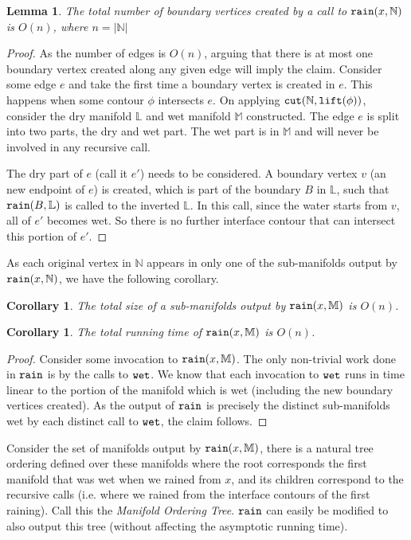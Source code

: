 \documentclass[11pt]{article}
\newtheorem{lemma}[theorem]{Lemma}
\newtheorem{corollary}[theorem]{Corollary}
\theoremstyle{definition}
\newcommand{\LL}{\mathbb{L}}
\newcommand{\MM}{\mathbb{M}}
\newcommand{\NN}{\mathbb{N}}
\newcommand{\cut}{{\tt cut}}
\newcommand{\lift}{{\tt lift}}
\newcommand{\rain}{{\tt rain}}
\newcommand{\wet}{{\tt wet}}
\begin{document}
\begin{lemma}\label{lem:new-verts}
The total number of boundary vertices created by a call to $\rain(x, \NN)$ is $O(n)$, where $n=|\NN|$
\end{lemma}
\begin{proof}
As the number of edges is $O(n)$, arguing that there is at most one boundary vertex created along any given edge will imply the claim.
Consider some edge $e$ and take the first time a boundary vertex is created in $e$.
This happens when some contour $\phi$ intersects $e$. On applying $\cut(\NN,\lift(\phi))$,
consider the dry manifold $\LL$ and wet manifold $\MM$ constructed. The edge $e$ is split into two parts, the dry and wet part.
The wet part is in $\MM$ and will never be involved in any recursive call.

The dry part of $e$ (call it $e'$) needs to be considered.
A boundary vertex $v$ (an new endpoint of $e$) is created, which is part of the boundary $B$ in $\LL$,
such that $\rain(B,\LL)$ is called to the inverted $\LL$. In this call, since the water starts from $v$,
all of $e'$ becomes wet. So there is no further interface contour that can intersect this portion of $e'$.
\end{proof}

As each original vertex in $\NN$ appears in only one of the sub-manifolds output by $\rain(x,\NN)$, we have the following corollary.

\begin{corollary}
The total size of a sub-manifolds output by $\rain(x,\MM)$ is $O(n)$.
\end{corollary}

\begin{corollary} \label{cor:rain-time} The total running time of $\rain(x,\MM)$ is $O(n)$.
\end{corollary}

\begin{proof} Consider some invocation to $\rain(x,\MM)$. The only non-trivial work done in $\rain$ is by the calls to $\wet$.
We know that each invocation to $\wet$ runs in time linear 
to the portion of the manifold which is wet (including the new boundary vertices created).  
As the output of $\rain$ is precisely the distinct sub-manifolds wet by each distinct call to $\wet$, the claim follows.
\end{proof}

Consider the set of manifolds output by $\rain(x,\MM)$, there is a natural tree ordering defined over these manifolds where the 
root corresponds the first manifold that was wet when we rained from $x$, and its children correspond to the recursive calls 
(i.e. where we rained from the interface contours of the first raining).  Call this the \emph{Manifold Ordering Tree}.
$\rain$ can easily be modified to also output this tree (without affecting the asymptotic running time).  
\end{document}
